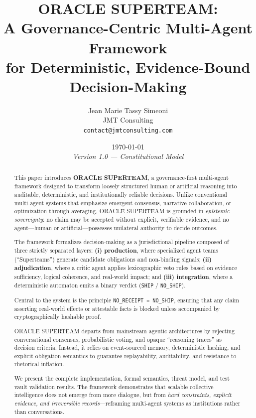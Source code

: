 \documentclass[11pt, letterpaper]{article}
\title{\textbf{ORACLE SUPERTEAM}:\\
A Governance-Centric Multi-Agent Framework\\
for Deterministic, Evidence-Bound Decision-Making}
\author{
Jean Marie Tassy Simeoni\\
\small JMT Consulting\\
\small \texttt{contact@jmtconsulting.com}
}
\date{\today\\[1em]
\small \textit{Version 1.0 — Constitutional Model}}
\begin{document}
\maketitle

\begin{abstract}
\noindent
This paper introduces \textbf{ORACLE SUPERTEAM}, a governance-first multi-agent framework designed to transform loosely structured human or artificial reasoning into auditable, deterministic, and institutionally reliable decisions. Unlike conventional multi-agent systems that emphasize emergent consensus, narrative collaboration, or optimization through averaging, ORACLE SUPERTEAM is grounded in \textit{epistemic sovereignty}: no claim may be accepted without explicit, verifiable evidence, and no agent—human or artificial—possesses unilateral authority to decide outcomes.

The framework formalizes decision-making as a jurisdictional pipeline composed of three strictly separated layers: \textbf{(i) production}, where specialized agent teams (``Superteams'') generate candidate obligations and non-binding signals; \textbf{(ii) adjudication}, where a critic agent applies lexicographic veto rules based on evidence sufficiency, logical coherence, and real-world impact; and \textbf{(iii) integration}, where a deterministic automaton emits a binary verdict (\texttt{SHIP} / \texttt{NO\_SHIP}).

Central to the system is the principle \texttt{NO\_RECEIPT = NO\_SHIP}, ensuring that any claim asserting real-world effects or attestable facts is blocked unless accompanied by cryptographically hashable proof.

ORACLE SUPERTEAM departs from mainstream agentic architectures by rejecting conversational consensus, probabilistic voting, and opaque ``reasoning traces'' as decision criteria. Instead, it relies on event-sourced memory, deterministic hashing, and explicit obligation semantics to guarantee replayability, auditability, and resistance to rhetorical inflation.

We present the complete implementation, formal semantics, threat model, and test vault validation results. The framework demonstrates that scalable collective intelligence does not emerge from more dialogue, but from \textit{hard constraints, explicit evidence, and irreversible records}—reframing multi-agent systems as institutions rather than conversations.
\end{abstract}
\end{document}
